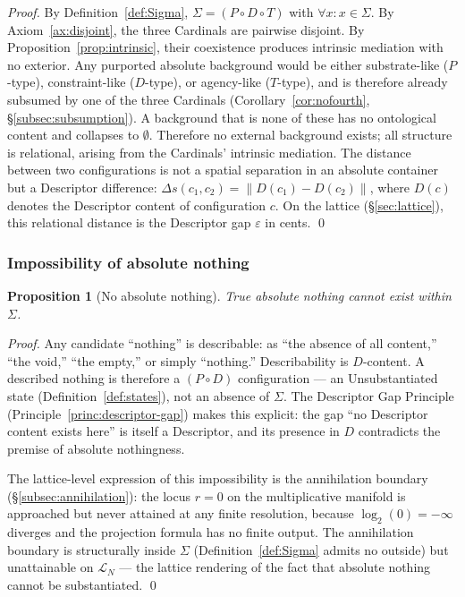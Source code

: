 \documentclass[11pt,a4paper]{article}
\newtheorem{proposition}[theorem]{Proposition}
\theoremstyle{definition}
\theoremstyle{remark}
\begin{document}
\begin{proof}
By Definition~\ref{def:Sigma}, $\Sigma = (P \circ D \circ T)$ with $\forall x: x \in \Sigma$. By Axiom~\ref{ax:disjoint}, the three Cardinals are pairwise disjoint. By Proposition~\ref{prop:intrinsic}, their coexistence produces intrinsic mediation with no exterior. Any purported absolute background would be either substrate-like ($P$-type), constraint-like ($D$-type), or agency-like ($T$-type), and is therefore already subsumed by one of the three Cardinals (Corollary~\ref{cor:nofourth}, \S\ref{subsec:subsumption}). A background that is none of these has no ontological content and collapses to $\emptyset$. Therefore no external background exists; all structure is relational, arising from the Cardinals' intrinsic mediation. The distance between two configurations is not a spatial separation in an absolute container but a Descriptor difference: $\Delta s(c_{1}, c_{2}) = \|D(c_{1}) - D(c_{2})\|$, where $D(c)$ denotes the Descriptor content of configuration $c$. On the lattice (\S\ref{sec:lattice}), this relational distance is the Descriptor gap $\varepsilon$ in cents. \qed
\end{proof}

\subsubsection{Impossibility of absolute nothing}\label{subsubsec:no-nothing}

\begin{proposition}[No absolute nothing]\label{prop:no-nothing}
True absolute nothing cannot exist within $\Sigma$.
\end{proposition}

\begin{proof}
Any candidate ``nothing'' is describable: as ``the absence of all content,'' ``the void,'' ``the empty,'' or simply ``nothing.'' Describability is $D$-content. A described nothing is therefore a $(P \circ D)$ configuration --- an Unsubstantiated state (Definition~\ref{def:states}), not an absence of $\Sigma$. The Descriptor Gap Principle (Principle~\ref{princ:descriptor-gap}) makes this explicit: the gap ``no Descriptor content exists here'' is itself a Descriptor, and its presence in $D$ contradicts the premise of absolute nothingness.

The lattice-level expression of this impossibility is the annihilation boundary (\S\ref{subsec:annihilation}): the locus $r = 0$ on the multiplicative manifold is approached but never attained at any finite resolution, because $\log_{2}(0) = -\infty$ diverges and the projection formula has no finite output. The annihilation boundary is structurally inside $\Sigma$ (Definition~\ref{def:Sigma} admits no outside) but unattainable on $\mathcal{L}_{N}$ --- the lattice rendering of the fact that absolute nothing cannot be substantiated. \qed
\end{proof}
\end{document}
